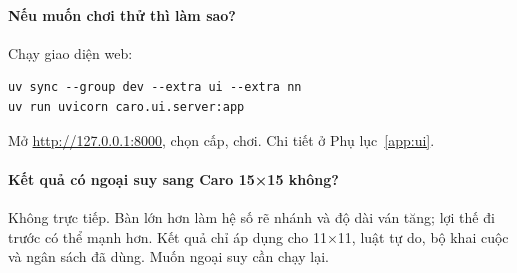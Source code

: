 \paragraph{Nếu muốn chơi thử thì làm sao?}
Chạy giao diện web:
\begin{lstlisting}[numbers=none]
uv sync --group dev --extra ui --extra nn
uv run uvicorn caro.ui.server:app
\end{lstlisting}
Mở \url{http://127.0.0.1:8000}, chọn cấp, chơi. Chi tiết ở Phụ lục~\ref{app:ui}.

\paragraph{Kết quả có ngoại suy sang Caro 15×15 không?}
Không trực tiếp. Bàn lớn hơn làm hệ số rẽ nhánh và độ dài ván tăng; lợi thế đi trước có thể
mạnh hơn. Kết quả chỉ áp dụng cho 11×11, luật tự do, bộ khai cuộc và ngân sách đã dùng. Muốn
ngoại suy cần chạy lại.